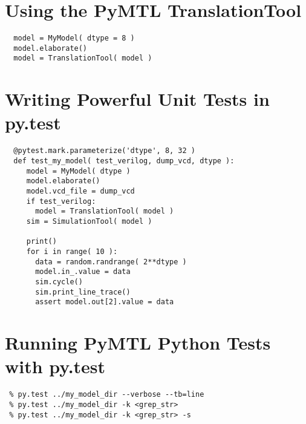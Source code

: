 \documentclass{cbxdoc}
\begin{document}
\section{Using the PyMTL TranslationTool}
\begin{verbatim}
  model = MyModel( dtype = 8 ) 
  model.elaborate()
  model = TranslationTool( model )
\end{verbatim}

\section{Writing Powerful Unit Tests in py.test}
\begin{verbatim}
  @pytest.mark.parameterize('dtype', 8, 32 )
  def test_my_model( test_verilog, dump_vcd, dtype ):
     model = MyModel( dtype )
     model.elaborate()
     model.vcd_file = dump_vcd
     if test_verilog:
       model = TranslationTool( model )
     sim = SimulationTool( model )

     print()
     for i in range( 10 ):
       data = random.randrange( 2**dtype )
       model.in_.value = data
       sim.cycle()
       sim.print_line_trace()
       assert model.out[2].value = data
\end{verbatim}


\section{Running PyMTL Python Tests with py.test}

\begin{verbatim}
 % py.test ../my_model_dir --verbose --tb=line
 % py.test ../my_model_dir -k <grep_str>
 % py.test ../my_model_dir -k <grep_str> -s
\end{verbatim}

\end{document}

